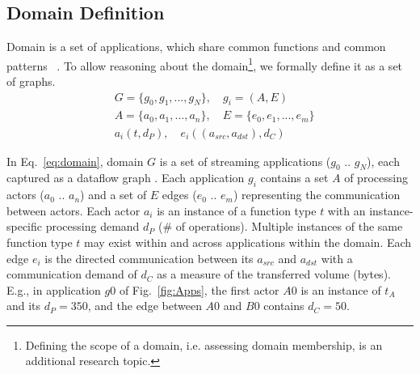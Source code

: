 \subsection{Domain Definition}
\label{sub:dmDefine}
Domain is a set of applications, which share common functions and common patterns ~\cite{kang1990feature}. To allow reasoning about the domain\footnote{Defining the scope of a domain, i.e. assessing domain membership, is an additional research topic.}, we formally define it as a set of graphs.
\begin{equation}
\begin{split}
\label{eq:domain}
	&G = \{g_{0}, g_{1}, ..., g_{N}\}, \quad g_{i} = (A, E)\\
	&A = \{a_{0}, a_{1}, ..., a_{n}\}, \quad E = \{e_{0}, e_{1}, ..., e_{m}\}\\
	&a_{i} (t, d_{P}), \quad e_{i} ((a_{src}, a_{dst}), d_{C})
\end{split}
\end{equation}

In Eq.~\eqref{eq:domain}, domain $G$ is a set of streaming applications ($g_{0}$ .. $g_{N}$), each captured as a dataflow graph \cite{stuijk2006sdf}. Each application $g_i$ contains a set $A$ of processing actors ($a_0$ .. $a_n$) and a set of $E$ edges ($e_0$ .. $e_m$) representing the communication between actors. Each actor $a_i$ is an instance of a function type $t$ with an instance-specific processing demand $d_{P}$ (\# of operations). Multiple instances of the same function type $t$ may exist within and across applications within the domain. Each edge $e_i$ is the directed communication between its  $a_{src}$ and  $a_{dst}$ with a communication demand of $d_{C}$ as a measure of the transferred volume (bytes). E.g., in application $g0$ of Fig.~\ref{fig:Apps}, the first actor $A0$ is an instance of $t_{A}$ and its $d_{P} = 350$, and the edge between $A0$ and $B0$ contains $d_{C} = 50$. 

